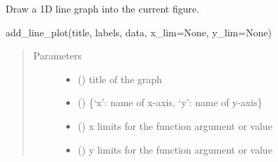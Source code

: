 \documentclass[letterpaper,10pt,english,openany,oneside]{sphinxmanual}
\begin{document}
\begin{fulllineitems}
\begin{fulllineitems}
\begin{quote}
\begin{description}
\begin{itemize}
\end{itemize}

\end{description}\end{quote}

\end{fulllineitems}


\begin{fulllineitems}
\label{\detokenize{pygpc:pygpc.vis.Visualization.add_line_plot}}
Draw a 1D line graph into the current figure.

add\_line\_plot(title, labels, data, x\_lim=None, y\_lim=None)
\begin{quote}\begin{description}
\item[{Parameters}] \leavevmode\begin{itemize}
\item {} 
 () \textendash{} title of the graph

\item {} 
 () \textendash{} \{‘x’: name of x-axis, ‘y’: name of y-axis\}

\item {} 
 (\sphinxstyleliteralemphasis{\sphinxupquote{{[}}}\sphinxstyleliteralemphasis{\sphinxupquote{{]} }}\sphinxstyleliteralemphasis{\sphinxupquote{, }}\sphinxstyleliteralemphasis{\sphinxupquote{, }}) \textendash{} x limits for the function argument or value

\item {} 
 (\sphinxstyleliteralemphasis{\sphinxupquote{{[}}}\sphinxstyleliteralemphasis{\sphinxupquote{{]} }}\sphinxstyleliteralemphasis{\sphinxupquote{, }}\sphinxstyleliteralemphasis{\sphinxupquote{, }}) \textendash{} y limits for the function argument or value


\end{itemize}
\end{description}
\end{quote}
\end{fulllineitems}
\end{fulllineitems}
\end{document}
